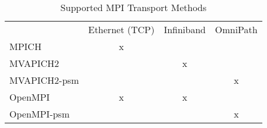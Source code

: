 \begin{table}[]
\centering
\caption{Supported MPI Transport Methods}
\label{mpi-transport-table}
\begin{tabular}{llll}
             & Ethernet (TCP)        & Infiniband            & OmniPath              \\
MPICH        & \multicolumn{1}{c}{x} &                       &                       \\
MVAPICH2     &                       & \multicolumn{1}{c}{x} &                       \\
MVAPICH2-psm &                       &                       & \multicolumn{1}{c}{x} \\
OpenMPI      & \multicolumn{1}{c}{x} & \multicolumn{1}{c}{x} &                       \\
OpenMPI-psm  &                       &                       & \multicolumn{1}{c}{x}
\end{tabular}
\end{table}
